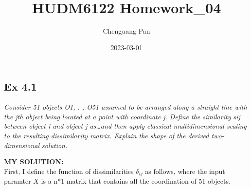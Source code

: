 \documentclass[
]{article}
\title{HUDM6122 Homework\_04}
\author{Chenguang Pan}
\date{2023-03-01}
\begin{document}
\maketitle

\hypertarget{ex-4.1}{%
\subsection{Ex 4.1}\label{ex-4.1}}

\emph{Consider 51 objects O1, . , O51 assumed to be arranged along a
straight line with the jth object being located at a point with
coordinate j. Define the similarity sij between object i and object j
as\ldots and then apply classical multidimensional scaling to the
resulting dissimilarity matrix. Explain the shape of the derived
two-dimensional solution.}

\textbf{MY SOLUTION:}\\
First, I define the function of dissimilarities \(\delta_{ij}\) as
follows, where the input paramter \(X\) is a n*1 matrix that contains
all the coordination of 51 objects.
\end{document}
